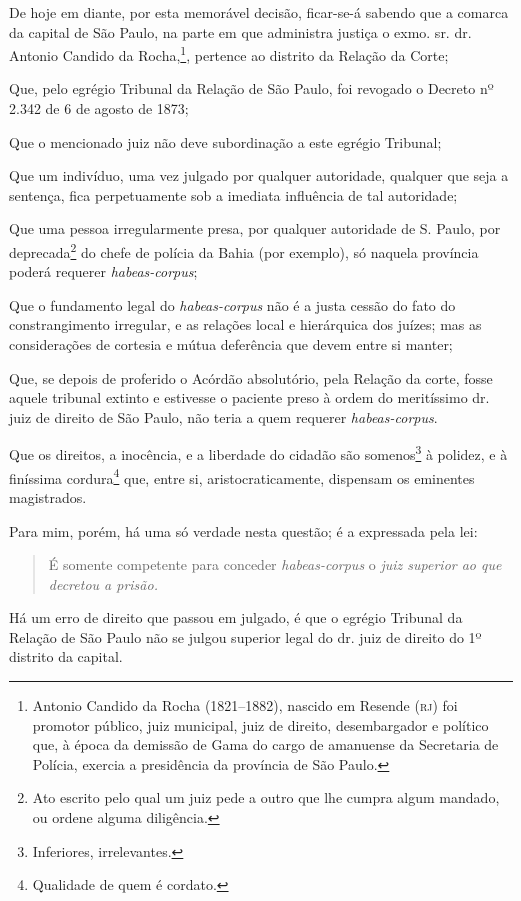 De hoje em diante, por esta memorável decisão, ficar-se-á sabendo que a
comarca da capital de São Paulo, na parte em que administra justiça o
exmo. sr. dr. Antonio Candido da Rocha,\footnote{ Antonio Candido da
  Rocha (1821--1882), nascido em Resende (\textsc{rj}) foi promotor público, juiz
  municipal, juiz de direito, desembargador e político que, à época da
  demissão de Gama do cargo de amanuense da Secretaria de Polícia,
  exercia a presidência da província de São Paulo.}, pertence ao
distrito da Relação da Corte;

Que, pelo egrégio Tribunal da Relação de São Paulo, foi revogado o
Decreto nº 2.342 de 6 de agosto de 1873;

Que o mencionado juiz não deve subordinação a este egrégio Tribunal;

Que um indivíduo, uma vez julgado por qualquer autoridade, qualquer que
seja a sentença, fica perpetuamente sob a imediata influência de tal
autoridade;

Que uma pessoa irregularmente presa, por qualquer autoridade de S.
Paulo, por deprecada\footnote{ Ato escrito pelo qual um juiz pede a
  outro que lhe cumpra algum mandado, ou ordene alguma diligência.} do
chefe de polícia da Bahia (por exemplo), só naquela província poderá
requerer \emph{habeas-corpus};

Que o fundamento legal do \emph{habeas-corpus} não é a justa cessão do
fato do constrangimento irregular, e as relações local e hierárquica dos
juízes; mas as considerações de cortesia e mútua deferência que devem
entre si manter;

Que, se depois de proferido o Acórdão absolutório, pela Relação da
corte, fosse aquele tribunal extinto e estivesse o paciente preso à
ordem do meritíssimo dr. juiz de direito de São Paulo, não teria a quem
requerer \emph{habeas-corpus}.

Que os direitos, a inocência, e a liberdade do cidadão são
somenos\footnote{ Inferiores, irrelevantes.} à polidez, e à finíssima
cordura\footnote{ Qualidade de quem é cordato.} que, entre si,
aristocraticamente, dispensam os eminentes magistrados.

Para mim, porém, há uma só verdade nesta questão; é a expressada pela
lei:

\begin{quote}
É somente competente para conceder \emph{habeas-corpus} o \emph{juiz
superior ao que decretou a prisão.}
\end{quote}

Há um erro de direito que passou em julgado, é que o egrégio Tribunal da
Relação de São Paulo não se julgou superior legal do dr. juiz de direito
do 1º distrito da capital.

